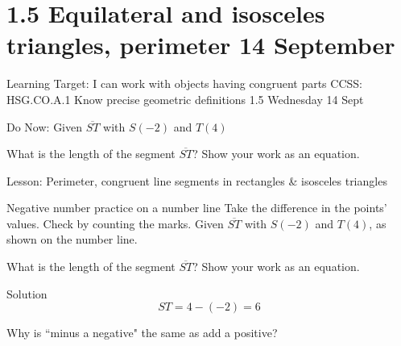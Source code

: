 \section{1.5 Equilateral and isosceles triangles, perimeter \hfill 14 September}
\begin{frame}{Learning Target: I can work with objects having congruent parts}
  {CCSS: HSG.CO.A.1 Know precise geometric definitions  \hfill \alert{1.5 Wednesday 14 Sept}}
    \begin{block}{Do Now: Given $\overline{ST}$ with $S(-2)$ and $T(4)$}
      \begin{center}
      \end{center}
    What is the length of the segment $\overline{ST}$? Show your work as an equation.
    \end{block} \vspace{2cm}
    Lesson: Perimeter, congruent line segments in rectangles \& isosceles triangles
  \end{frame}

\begin{frame}{Negative number practice on a number line}
  {Take the difference in the points' values. Check by counting the marks.}
  Given $\overline{ST}$ with $S(-2)$ and $T(4)$, as shown on the number line.
  \begin{center}
  \end{center}
  What is the length of the segment $\overline{ST}$? Show your work as an equation. \par \bigskip
  \qquad Solution 
  $$ST=4-(-2)=6$$
  \par \vspace{2cm}
  Why is ``minus a negative" the same as add a positive? 
\end{frame}

